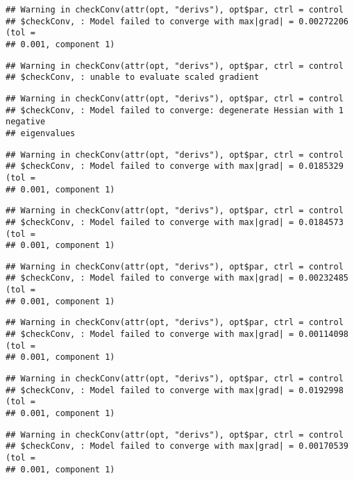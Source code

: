 \documentclass[]{article}
\begin{document}
\begin{verbatim}
## Warning in checkConv(attr(opt, "derivs"), opt$par, ctrl = control
## $checkConv, : Model failed to converge with max|grad| = 0.00272206 (tol =
## 0.001, component 1)
\end{verbatim}

\begin{verbatim}
## Warning in checkConv(attr(opt, "derivs"), opt$par, ctrl = control
## $checkConv, : unable to evaluate scaled gradient
\end{verbatim}

\begin{verbatim}
## Warning in checkConv(attr(opt, "derivs"), opt$par, ctrl = control
## $checkConv, : Model failed to converge: degenerate Hessian with 1 negative
## eigenvalues
\end{verbatim}

\begin{verbatim}
## Warning in checkConv(attr(opt, "derivs"), opt$par, ctrl = control
## $checkConv, : Model failed to converge with max|grad| = 0.0185329 (tol =
## 0.001, component 1)
\end{verbatim}

\begin{verbatim}
## Warning in checkConv(attr(opt, "derivs"), opt$par, ctrl = control
## $checkConv, : Model failed to converge with max|grad| = 0.0184573 (tol =
## 0.001, component 1)
\end{verbatim}

\begin{verbatim}
## Warning in checkConv(attr(opt, "derivs"), opt$par, ctrl = control
## $checkConv, : Model failed to converge with max|grad| = 0.00232485 (tol =
## 0.001, component 1)
\end{verbatim}

\begin{verbatim}
## Warning in checkConv(attr(opt, "derivs"), opt$par, ctrl = control
## $checkConv, : Model failed to converge with max|grad| = 0.00114098 (tol =
## 0.001, component 1)
\end{verbatim}

\begin{verbatim}
## Warning in checkConv(attr(opt, "derivs"), opt$par, ctrl = control
## $checkConv, : Model failed to converge with max|grad| = 0.0192998 (tol =
## 0.001, component 1)
\end{verbatim}

\begin{verbatim}
## Warning in checkConv(attr(opt, "derivs"), opt$par, ctrl = control
## $checkConv, : Model failed to converge with max|grad| = 0.00170539 (tol =
## 0.001, component 1)
\end{verbatim}
\end{document}
